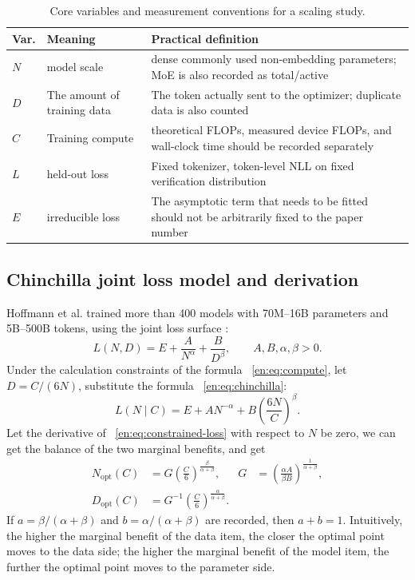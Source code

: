 \documentclass[UTF8,10pt,a4paper,fontset=none]{ctexart}
\begin{document}
\begin{table}[htbp]
\centering
\caption{Core variables and measurement conventions for a scaling study.}
\label{en:tab:symbols}
\begin{tabularx}{\textwidth}{C{1.0cm}YY}
\toprule
Var. & Meaning & Practical definition \\
\midrule
$N$ & model scale & dense commonly used non-embedding parameters; MoE is also recorded as total/active \\
$D$ & The amount of training data & The token actually sent to the optimizer; duplicate data is also counted \\
$C$ & Training compute & theoretical FLOPs, measured device FLOPs, and wall-clock time should be recorded separately \\
$L$ & held-out loss & Fixed tokenizer, token-level NLL on fixed verification distribution \\
$E$ & irreducible loss & The asymptotic term that needs to be fitted should not be arbitrarily fixed to the paper number \\
\bottomrule
\end{tabularx}
\end{table}

\subsection{Chinchilla joint loss model and derivation}

Hoffmann et al. trained more than 400 models with 70M--16B parameters and 5B--500B tokens, using the joint loss surface \cite{en:hoffmann2022}:
\begin{equation}
  L(N,D)=E+\frac{A}{N^{\alpha}}+\frac{B}{D^{\beta}},
  \qquad A,B,\alpha,\beta>0.
  \label{en:eq:chinchilla}
\end{equation}
Under the calculation constraints of the formula ~\eqref{en:eq:compute}, let $D=C/(6N)$, substitute the formula ~\eqref{en:eq:chinchilla}:
\begin{equation}
  L(N\mid C)=E+A N^{-\alpha}
  +B\left(\frac{6N}{C}\right)^{\beta}.
  \label{en:eq:constrained-loss}
\end{equation}
Let the derivative of ~\eqref{en:eq:constrained-loss} with respect to $N$ be zero, we can get the balance of the two marginal benefits, and get
\begin{align}
  N_{\mathrm{opt}}(C)
  &=G\left(\frac{C}{6}\right)^{\frac{\beta}{\alpha+\beta}},
  &G&=\left(\frac{\alpha A}{\beta B}\right)^{\frac{1}{\alpha+\beta}},
  \label{en:eq:nopt}\\
  D_{\mathrm{opt}}(C)
  &=G^{-1}\left(\frac{C}{6}\right)^{\frac{\alpha}{\alpha+\beta}}.
  \label{en:eq:dopt}
\end{align}
If $a=\beta/(\alpha+\beta)$ and $b=\alpha/(\alpha+\beta)$ are recorded, then $a+b=1$. Intuitively, the higher the marginal benefit of the data item, the closer the optimal point moves to the data side; the higher the marginal benefit of the model item, the further the optimal point moves to the parameter side.
\end{document}
